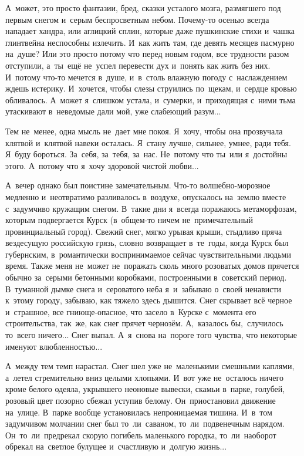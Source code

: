 А~может, это просто фантазии, бред, сказки усталого мозга, размягшего под первым снегом и~серым беспросветным небом.
Почему-то осенью всегда нападает хандра, или аглицкий сплин, которые даже пушкинские стихи и~чашка глинтвейна неспособны излечить.
И~как жить там, где девять месяцев пасмурно на~душе?
Или это просто потому что перед новым годом, все трудности разом отступили, а~ты~ещё не~успел перевести дух и~понять как жить без них.
И~потому что-то мечется в~душе, и~в~столь влажную погоду с~наслаждением ждешь истерику.
И~хочется, чтобы слезы струились по~щекам, и~сердце кровью обливалось.
А~может я~слишком устала, и~сумерки, и~приходящая с~ними тьма утаскивают в~неведомые дали мой, уже слабеющий разум...

Тем не~менее, одна мысль не~дает мне покоя.
Я~хочу, чтобы она прозвучала клятвой и~клятвой навеки осталась.
Я~стану лучше, сильнее, умнее, ради тебя.
Я~буду бороться.
За~себя, за~тебя, за~нас.
Не~потому что ты~или я~достойны этого.
А~потому что я~хочу здоровой чистой любви...

А~вечер однако был поистине замечательным.
Что-то волшебно-морозное медленно и~неотвратимо разливалось в~воздухе, опускалось на~землю вместе с~задумчиво кружащим снегом.
В~такие дни я~всегда поражаюсь метаморфозам, которым подвергается Курск (в~общем-то ничем не~примечательный провинциальный город).
Свежий снег, мягко урывая крыши, стыдливо пряча вездесущую российскую грязь, словно возвращает в~те~годы, когда Курск был губернским, в~романтически воспринимаемое сейчас чувствительными людьми время.
Также меня не~может не~поражать сколь много розоватых домов прячется обычно за~серыми бетонными коробками, построенными в~советский период.
В~туманной дымке снега и~сероватого неба я~и~забываю о~своей ненависти к~этому городу, забываю, как тяжело здесь дышится.
Снег скрывает всё черное и~страшное, все гниюще-опасное, что засело в~Курске с~момента его строительства, так~же, как снег прячет чернозём.
А,~казалось бы,~случилось то~всего ничего...
Снег выпал.
А~я~снова на~пороге того чувства, что некоторые именуют влюбленностью...

А~между тем темп нарастал.
Снег шел уже не~маленькими смешными каплями, а~летел стремительно вниз целыми хлопьями.
И~вот уже не~осталось ничего кроме белого одеяла, укрывшего неоновые вывески, скамьи в~парке, голубей, розовый цвет позорно сбежал уступив белому.
Он~приостановил движение на~улице.
В~парке вообще установилась непроницаемая тишина.
И~в~том задумчивом молчании снег был то~ли~саваном, то~ли~подвенечным нарядом.
Он~то~ли~предрекал скорую погибель маленького городка, то~ли~наоборот обрекал на~светлое булущее и~счастливую и~долгую жизнь...